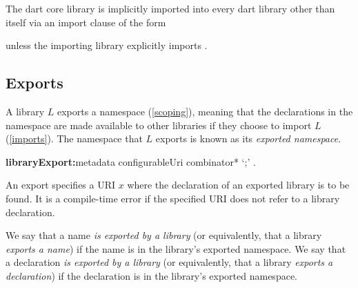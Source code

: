 \documentclass{article}
\begin{document}

\LMHash{}
The dart core library  is implicitly imported into every dart library other than itself via an import clause of the form


unless the importing library explicitly imports .




\subsection{Exports}

\LMHash{}
A library $L$ exports a namespace (\ref{scoping}), meaning that the declarations in the namespace are made available to other libraries if they choose to import $L$ (\ref{imports}).
The namespace that $L$ exports is known as its {\em exported namespace}.

\begin{grammar}
{\bf libraryExport:}metadata \EXPORT{} configurableUri combinator* `{\escapegrammar ;}'
  .
\end{grammar}

\LMHash{}
An export specifies a URI $x$ where the declaration of an exported library is to be found.
It is a compile-time error if the specified URI does not refer to a library declaration.

\LMHash{}
We say that a name {\em is exported by a library} (or equivalently, that a library {\em exports a name}) if the name is in the library's exported namespace.
We say that a declaration {\em is exported by a library} (or equivalently, that a library {\em exports a declaration}) if the declaration is in the library's exported namespace.
\end{document}
